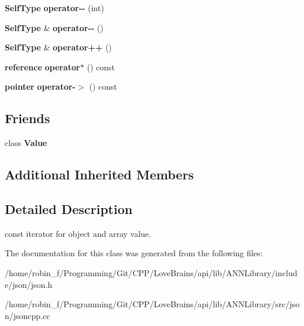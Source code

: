\begin{DoxyCompactItemize}
\item 
{\bf Self\+Type} {\bfseries operator-\/-\/} (int)\label{class_json_1_1_value_const_iterator_a94935961e9331c6f7b907b05ec8df75e}

\item 
{\bf Self\+Type} \& {\bfseries operator-\/-\/} ()\label{class_json_1_1_value_const_iterator_a31415e44e44e56fb2bfda7e8bb784646}

\item 
{\bf Self\+Type} \& {\bfseries operator++} ()\label{class_json_1_1_value_const_iterator_a2cfe2f7a94a688186efdafb1b181c319}

\item 
{\bf reference} {\bfseries operator$\ast$} () const \label{class_json_1_1_value_const_iterator_aeb44153d71c61ac9397a84d5ecc244c5}

\item 
{\bf pointer} {\bfseries operator-\/$>$} () const \label{class_json_1_1_value_const_iterator_ac493d31c8eede8af10b71415fe8e624b}

\end{DoxyCompactItemize}
\subsection*{Friends}
\begin{DoxyCompactItemize}
\item 
class {\bfseries Value}\label{class_json_1_1_value_const_iterator_a896c037a32087c5c20d97e64a1786880}

\end{DoxyCompactItemize}
\subsection*{Additional Inherited Members}


\subsection{Detailed Description}
const iterator for object and array value. 



The documentation for this class was generated from the following files\+:\begin{DoxyCompactItemize}
\item 
/home/robin\+\_\+f/\+Programming/\+Git/\+C\+P\+P/\+Love\+Brains/api/lib/\+A\+N\+N\+Library/include/json/json.\+h\item 
/home/robin\+\_\+f/\+Programming/\+Git/\+C\+P\+P/\+Love\+Brains/api/lib/\+A\+N\+N\+Library/src/json/jsoncpp.\+cc\end{DoxyCompactItemize}
